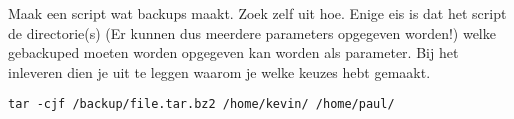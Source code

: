 \question[20] Maak een script wat backups maakt. Zoek zelf uit hoe. Enige eis is dat het script de directorie(s) (Er kunnen dus meerdere parameters opgegeven worden!) welke gebackuped moeten worden opgegeven kan worden als parameter. Bij het inleveren dien je uit te leggen waarom je welke keuzes hebt gemaakt.
\begin{solution}
\begin{lstlisting}
tar -cjf /backup/file.tar.bz2 /home/kevin/ /home/paul/
\end{lstlisting}
\end{solution}
